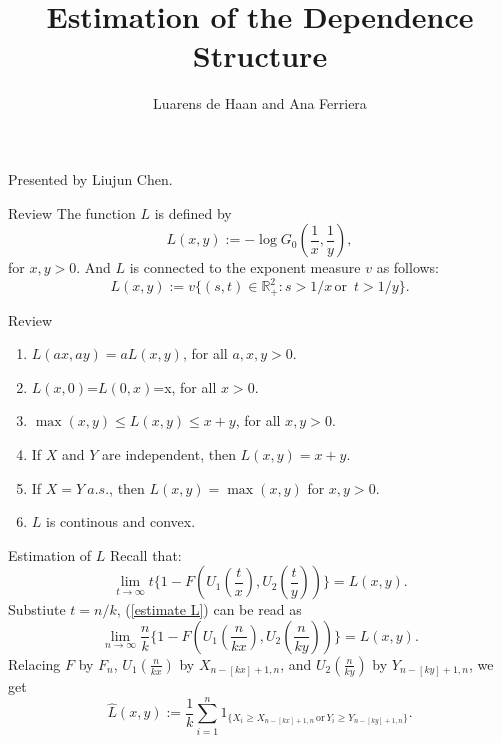 \documentclass[11pt]{beamer}
\author{Luarens de Haan and Ana Ferriera}
\title{Estimation of the Dependence Structure}
\begin{document}
\begin{frame}
\titlepage
\begin{center}
	Presented by Liujun Chen.
\end{center}
\end{frame}


\begin{frame}{Review}
The function $L$ is defined by
$$L(x,y):=-\log G_0(\frac{1}{x},\frac{1}{y}),$$
for $x,y>0$. And $L$ is connected to the exponent measure $v$ as follows:
\begin{displaymath}
L(x,y):=v\{ (s,t)\in \mathbb{R}_{+}^2: s>1/x \, \text{or }\, t>1/y\}.
\end{displaymath}
\end{frame}

\begin{frame}{Review}
\begin{enumerate}
\item $L(ax,ay)=aL(x,y)$, for all $a,x,y>0$.
\item $L(x,0)$=$L(0,x)$=x, for all $x>0$.
\item $\max(x,y)\le L(x,y)\le x+y $, for all $x,y>0$.
\item If $X$ and $Y$ are independent, then $L(x,y)=x+y.$
\item If $X=Y \ a.s.$, then $L(x,y)=\max(x,y)$ for $x,y >0$.
\item $L$ is continous and convex.
\end{enumerate}
\end{frame}
\begin{frame}{Estimation of $L$}
Recall that:
\begin{equation}\label{estimate L}
\lim_{t \to \infty}t \{ 1-F(U_1(\frac{t}{x}),U_2(\frac{t}{y}))\}=L(x,y).
\end{equation}
Substiute $t=n/k$,
(\ref{estimate L}) can be read as
\begin{equation}
\lim_{n \to \infty}\frac{n}{k}\{ 1-F(U_1(\frac{n}{kx}),U_2(\frac{n}{ky}))\}=L(x,y).
\end{equation}
Relacing $F$ by $F_n$, $U_1(\frac{n}{kx})$ by $X_{n-[kx]+1,n}$, and  $U_2(\frac{n}{ky})$ by $Y_{n-[ky]+1,n}$, we get
\begin{equation}
\hat{L}(x,y):=\frac{1}{k}\sum_{i=1}^n 1_{\{X_i\ge X_{n-[kx]+1,n}\, \text{or}\, Y_i \ge Y_{n-[ky]+1,n}\}}.
\end{equation}
\end{frame}
\end{document}
